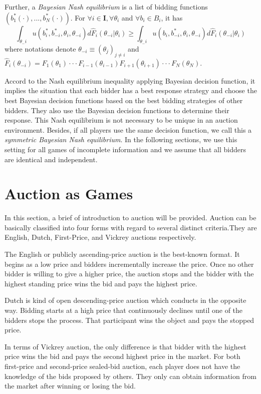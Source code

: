 Further, a \emph{Bayesian Nash equilibrium} is a list of bidding functions $(b_{1}^{*}(\cdot),...,b_{N}^{*}(\cdot))$. For $\forall i \in \bm{I}, \forall \theta_i$ and $\forall b_i \in B_i$, it has
\begin{equation}
\int_{\theta_-i}u(b_{i}^{*}, b_{-i}^{*}, \theta_{i}, \theta_{-i})d\hat{F}_{i}(\theta_{-i}|\theta_{i}) \geq \int_{\theta_-i}u(b_{i}, b_{-i}^{*}, \theta_{i}, \theta_{-i})d\hat{F}_{i}(\theta_{-i}|\theta_{i})
\end{equation}
where notations denote $\theta_{-i} \equiv (\theta_{j})_{j \neq i}$ and $\hat{F}_{i}(\theta_{-i})=F_{1}(\theta_1)\cdot \cdot \cdot F_{i-1}(\theta_{i-1})F_{i+1}(\theta_{i+1})\cdot \cdot \cdot F_{N}(\theta_{N})$.

Accord to the Nash equilibrium inequality applying Bayesian decision function, it implies the situation that each bidder has a best response strategy and choose the best Bayesian decision functions based on the best bidding strategies of other bidders. They also use the Bayesian decision functions to determine their response. This Nash equilibrium is not necessary to be unique in an auction environment. Besides, if all players use the same decision function, we call this a \emph{symmetric Bayesian Nash equilibrium}. In the following sections, we use this setting for all games of incomplete information and we assume that all bidders are identical and independent.
\section{Auction as Games}
In this section, a brief of introduction to auction will be provided. Auction can be basically classified into four forms with regard to several distinct criteria.They are English, Dutch, First-Price, and Vickrey auctions respectively. 

The English or publicly ascending-price auction is the best-known format. It begins as a low price and bidders incrementally increase the price. Once no other bidder is willing to give a higher price, the auction stops and the bidder with the highest standing price wins the bid and pays the highest price. 

Dutch is kind of open descending-price auction which conducts in the opposite way. Bidding starts at a high price that continuously declines until one of the bidders stops the process. That participant wins the object and pays the stopped price.

In terms of Vickrey auction, the only difference is that bidder with the highest price wins the bid and pays the second highest price in the market. For both first-price and second-price sealed-bid auction, each player does not have the knowledge of the bids proposed by others. They only can obtain information from the market after winning or losing the bid. 

